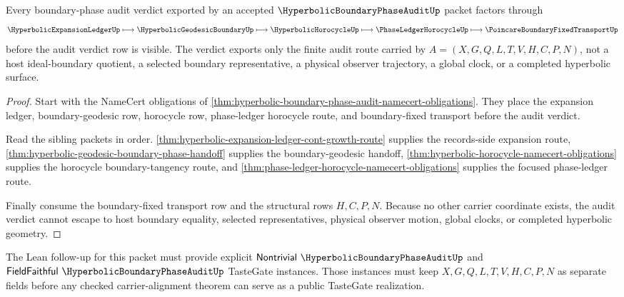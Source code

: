 \begin{theorem}
\label{thm:hyperbolic-boundary-phase-audit-route-nonescape}
Every boundary-phase audit verdict exported by an accepted $\HyperbolicBoundaryPhaseAuditUp$ packet factors through
$$
\HyperbolicExpansionLedgerUp \longmapsto \HyperbolicGeodesicBoundaryUp \longmapsto \HyperbolicHorocycleUp \longmapsto \PhaseLedgerHorocycleUp \longmapsto \PoincareBoundaryFixedTransportUp
$$
before the audit verdict row is visible. The verdict exports only the finite audit route carried by $A=(X,G,Q,L,T,V,H,C,P,N)$, not a host ideal-boundary quotient, a selected boundary representative, a physical observer trajectory, a global clock, or a completed hyperbolic surface.
\end{theorem}
\begin{proof}
Start with the NameCert obligations of \autoref{thm:hyperbolic-boundary-phase-audit-namecert-obligations}. They place the expansion ledger, boundary-geodesic row, horocycle row, phase-ledger horocycle route, and boundary-fixed transport before the audit verdict.

Read the sibling packets in order. \autoref{thm:hyperbolic-expansion-ledger-cont-growth-route} supplies the records-side expansion route, \autoref{thm:hyperbolic-geodesic-boundary-phase-handoff} supplies the boundary-geodesic handoff, \autoref{thm:hyperbolic-horocycle-namecert-obligations} supplies the horocycle boundary-tangency route, and \autoref{thm:phase-ledger-horocycle-namecert-obligations} supplies the focused phase-ledger route.

Finally consume the boundary-fixed transport row and the structural rows $H,C,P,N$. Because no other carrier coordinate exists, the audit verdict cannot escape to host boundary equality, selected representatives, physical observer motion, global clocks, or completed hyperbolic geometry.
\end{proof}

The Lean follow-up for this packet must provide explicit $\mathsf{Nontrivial}\ \HyperbolicBoundaryPhaseAuditUp$ and $\mathsf{FieldFaithful}\ \HyperbolicBoundaryPhaseAuditUp$ TasteGate instances. Those instances must keep $X,G,Q,L,T,V,H,C,P,N$ as separate fields before any checked carrier-alignment theorem can serve as a public TasteGate realization.


